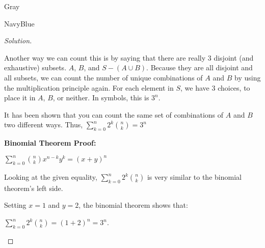 \documentclass[12pt]{amsart}
\theoremstyle{named}
\newenvironment{soln}
{\begin{color}{Gray}\begin{framed}\begin{color}{NavyBlue}\begin{proof}[Solution]
\doublespacing}
{\end{proof}\end{color}\end{framed}\end{color}}
\theoremstyle{definition}
\begin{document}
\begin{soln}
\begin{adjustwidth}{2em}{0em}
        \phantom{ }

        \noindent Another way we can count this is by saying that there are
        really $3$ disjoint (and exhaustive) subsets. $A$, $B$, and $S - (A \cup
        B)$. Because they are all disjoint and all subsets, we can count the
        number of unique combinations of $A$ and $B$ by using the multiplication
        principle again. For each element in $S$, we have $3$ choices, to place
        it in $A$, $B$, or neither. In symbols, this is $3^n$. 

        \phantom{ }

        \noindent It has been shown that you can count the same set of combinations of $A$ and $B$
        two different ways. Thus, $\displaystyle \sum_{k=0}^n2^k{n\choose k} = 3^n$
    \end{adjustwidth}

    \phantom{ }

    \textbf{Binomial Theorem Proof:}

    \begin{adjustwidth}{2em}{0em}
        $\displaystyle\sum_{k = 0}^{n} {n \choose k} x^{n-k}y^k = (x + y)^n$

        \phantom{ }

        \noindent Looking at the given equality, $\displaystyle \sum_{k=0}^n2^k{n\choose k}$ is
        very similar to the binomial theorem's left side. 
        
        \noindent Setting $x = 1$ and $y = 2$, the binomial theorem shows that:

        \noindent $\displaystyle\sum_{k = 0}^{n} 2^k {n \choose k} = (1 + 2)^n = 3^n$.
    \end{adjustwidth}

\end{soln}

\end{document}

